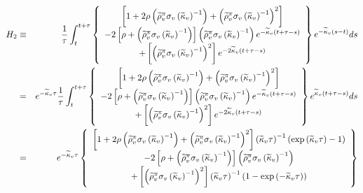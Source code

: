 \documentclass{article}
\begin{document}
\begin{eqnarray*}
H_{2} &\equiv &\frac{1}{\tau }\int_{t}^{t+\tau }\left\{ 
\begin{array}{c}
\left[ 1+2\rho \left( \widetilde{\rho }_{v}^{\pi }\sigma _{v}\left( 
\widetilde{\kappa }_{v}\right) ^{-1}\right) +\left( \widetilde{\rho }%
_{v}^{\pi }\sigma _{v}\left( \widetilde{\kappa }_{v}\right) ^{-1}\right) ^{2}%
\right]  \\ 
-2\left[ \rho +\left( \widetilde{\rho }_{v}^{\pi }\sigma _{v}\left( 
\widetilde{\kappa }_{v}\right) ^{-1}\right) \right] \left( \widetilde{\rho }%
_{v}^{\pi }\sigma _{v}\left( \widetilde{\kappa }_{v}\right) ^{-1}\right) e^{-%
\widetilde{\kappa }_{v}\left( t+\tau -s\right) } \\ 
+\left[ \left( \widetilde{\rho }_{v}^{\pi }\sigma _{v}\left( \widetilde{%
\kappa }_{v}\right) ^{-1}\right) ^{2}\right] e^{-2\widetilde{\kappa }%
_{v}\left( t+\tau -s\right) }%
\end{array}%
\right\} e^{-\widetilde{\kappa }_{v}\left( s-t\right) }ds \\
&=&e^{-\widetilde{\kappa }_{v}\tau }\frac{1}{\tau }\int_{t}^{t+\tau }\left\{ 
\begin{array}{c}
\left[ 1+2\rho \left( \widetilde{\rho }_{v}^{\pi }\sigma _{v}\left( 
\widetilde{\kappa }_{v}\right) ^{-1}\right) +\left( \widetilde{\rho }%
_{v}^{\pi }\sigma _{v}\left( \widetilde{\kappa }_{v}\right) ^{-1}\right) ^{2}%
\right]  \\ 
-2\left[ \rho +\left( \widetilde{\rho }_{v}^{\pi }\sigma _{v}\left( 
\widetilde{\kappa }_{v}\right) ^{-1}\right) \right] \left( \widetilde{\rho }%
_{v}^{\pi }\sigma _{v}\left( \widetilde{\kappa }_{v}\right) ^{-1}\right) e^{-%
\widetilde{\kappa }_{v}\left( t+\tau -s\right) } \\ 
+\left[ \left( \widetilde{\rho }_{v}^{\pi }\sigma _{v}\left( \widetilde{%
\kappa }_{v}\right) ^{-1}\right) ^{2}\right] e^{-2\widetilde{\kappa }%
_{v}\left( t+\tau -s\right) }%
\end{array}%
\right\} e^{\widetilde{\kappa }_{v}\left( t+\tau -s\right) }ds \\
&=&e^{-\widetilde{\kappa }_{v}\tau }\left\{ 
\begin{array}{c}
\left[ 1+2\rho \left( \widetilde{\rho }_{v}^{\pi }\sigma _{v}\left( 
\widetilde{\kappa }_{v}\right) ^{-1}\right) +\left( \widetilde{\rho }%
_{v}^{\pi }\sigma _{v}\left( \widetilde{\kappa }_{v}\right) ^{-1}\right) ^{2}%
\right] \left( \widetilde{\kappa }_{v}\tau \right) ^{-1}\left( \exp \left( 
\widetilde{\kappa }_{v}\tau \right) -1\right)  \\ 
-2\left[ \rho +\left( \widetilde{\rho }_{v}^{\pi }\sigma _{v}\left( 
\widetilde{\kappa }_{v}\right) ^{-1}\right) \right] \left( \widetilde{\rho }%
_{v}^{\pi }\sigma _{v}\left( \widetilde{\kappa }_{v}\right) ^{-1}\right)  \\ 
+\left[ \left( \widetilde{\rho }_{v}^{\pi }\sigma _{v}\left( \widetilde{%
\kappa }_{v}\right) ^{-1}\right) ^{2}\right] \left( \widetilde{\kappa }%
_{v}\tau \right) ^{-1}\left( 1-\exp \left( -\widetilde{\kappa }_{v}\tau
\right) \right) 
\end{array}%
\right\} 
\end{eqnarray*}%
\end{document}
